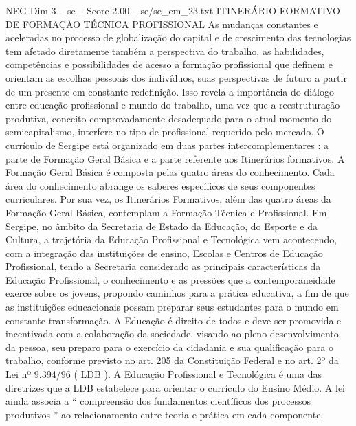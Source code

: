 \begin{textsample}{NEG Dim 3 – se – Score 2.00 – se/se\_em\_23.txt}  \label{ex:f3_neg_130}
ITINERÁRIO FORMATIVO DE FORMAÇÃO TÉCNICA PROFISSIONAL As mudanças constantes e aceleradas no processo de globalização do capital e de crescimento das tecnologias tem afetado diretamente também a perspectiva do trabalho, as habilidades, competências e possibilidades de acesso a formação profissional que definem e orientam as escolhas pessoais dos indivíduos, suas perspectivas de futuro a partir de um presente em constante redefinição.
Isso revela a importância do diálogo entre educação profissional e mundo do trabalho, uma vez que a reestruturação produtiva, conceito comprovadamente desadequado para o atual momento do semicapitalismo, interfere no tipo de profissional requerido pelo mercado.
O currículo de Sergipe está organizado em duas partes intercomplementares : a parte de Formação Geral Básica e a parte referente aos Itinerários formativos.
A Formação Geral Básica é composta pelas quatro áreas do conhecimento.
Cada área do conhecimento abrange os saberes específicos de seus componentes curriculares.
Por sua vez, os Itinerários Formativos, além das quatro áreas da Formação Geral Básica, contemplam a Formação Técnica e Profissional.
Em Sergipe, no âmbito da Secretaria de Estado da Educação, do Esporte e da Cultura, a trajetória da Educação Profissional e Tecnológica vem acontecendo, com a integração das instituições de ensino, Escolas e Centros de Educação Profissional, tendo a Secretaria considerado as principais características da Educação Profissional, o conhecimento e as pressões que a contemporaneidade exerce sobre os jovens, propondo caminhos para a prática educativa, a fim de que as instituições educacionais possam preparar seus estudantes para o mundo em constante transformação.
A Educação é direito de todos e deve ser promovida e incentivada com a colaboração da sociedade, visando ao pleno desenvolvimento da pessoa, seu preparo para o exercício da cidadania e sua qualificação para o trabalho, conforme previsto no art. 205 da Constituição Federal e no art. 2º da Lei nº 9.394/96 ( LDB ).
A Educação Profissional e Tecnológica é uma das diretrizes que a LDB estabelece para orientar o currículo do Ensino Médio.
A lei ainda associa a “ compreensão dos fundamentos científicos dos processos produtivos ” ao relacionamento entre teoria e prática em cada componente.

\end{textsample}
